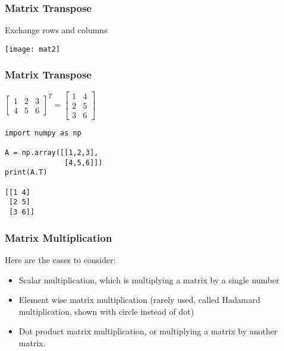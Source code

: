  \begin{frame}[fragile] \frametitle{Matrix Transpose}
Exchange rows and columns

\begin{center}
\texttt{[image: mat2]}
\end{center}
\end{frame}

\begin{frame}[fragile]\frametitle{Matrix Transpose}
 
$\begin{bmatrix}1 & 2 & 3 \\4 & 5 & 6\end{bmatrix}^{T} = \begin{bmatrix}1 & 4\\2 & 5\\3 & 6 \end{bmatrix}$

\begin{lstlisting}
import numpy as np

A = np.array([[1,2,3],
              [4,5,6]])
print(A.T)

[[1 4]
 [2 5]
 [3 6]]
\end{lstlisting}

\end{frame}

 \begin{frame}[fragile] \frametitle{Matrix Multiplication}
 Here are the cases to consider:
\begin{itemize}
\item Scalar multiplication, which is
multiplying a matrix by a single number
\item Element wise matrix multiplication (rarely used, called Hadamard multiplication, shown with circle instead of dot)
\item Dot product matrix multiplication, or
multiplying a matrix by another matrix.
\end{itemize}

\end{frame}


